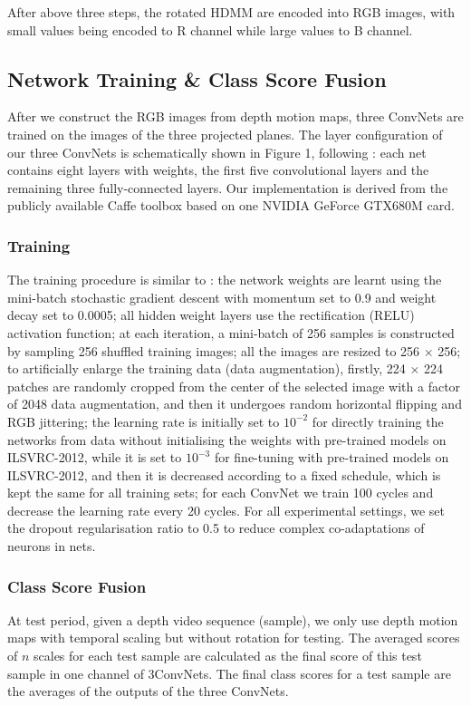 \documentclass[conference]{IEEEtran}
\begin{document}
After above three steps, the rotated HDMM are encoded into RGB images, with small values being encoded to R channel while large values to B channel.

\subsection{Network Training \& Class Score Fusion}
After we construct the RGB images from depth motion maps, three ConvNets are trained on the images of the three projected planes. The layer configuration of our three ConvNets is schematically shown in Figure 1, following \cite{krizhevsky2012imagenet}: each net contains eight layers with weights, the first five convolutional layers and the remaining three fully-connected layers. Our implementation is derived from the publicly available Caffe toolbox \cite{jia2014caffe} based on one NVIDIA GeForce GTX680M card.
\subsubsection*{Training}
The training procedure is similar to \cite{krizhevsky2012imagenet}: the network weights are learnt using the mini-batch stochastic gradient descent with momentum set to 0.9 and weight decay set to 0.0005; all hidden weight layers use the rectification (RELU) activation function; at each iteration, a mini-batch of 256 samples is constructed by sampling 256 shuffled training images; all the images are resized to 256 $\times$ 256; to artificially enlarge the training data (data augmentation), firstly, 224 $\times$ 224 patches are randomly cropped from the center of the selected image with a factor of 2048 data augmentation, and then it undergoes random horizontal flipping and RGB jittering; the learning rate is initially set to $10^{-2}$ for directly training the networks from data without initialising the weights with pre-trained models on ILSVRC-2012, while it is set to $10^{-3}$ for fine-tuning with pre-trained models on ILSVRC-2012, and then it is decreased according to a fixed schedule, which is kept the same for all training sets; for each ConvNet we train 100 cycles and decrease the learning rate every 20 cycles. For all experimental settings, we set the dropout regularisation ratio to 0.5 to reduce complex co-adaptations of neurons in nets.

\subsubsection*{Class Score Fusion}
At test period, given a depth video sequence (sample), we only use depth motion maps with temporal scaling but without rotation for testing. The averaged scores of $n$ scales for each test sample are calculated as the final score of this test sample in one channel of 3ConvNets.
The final class scores for a test sample are the averages of the outputs of the three ConvNets.
\end{document}
